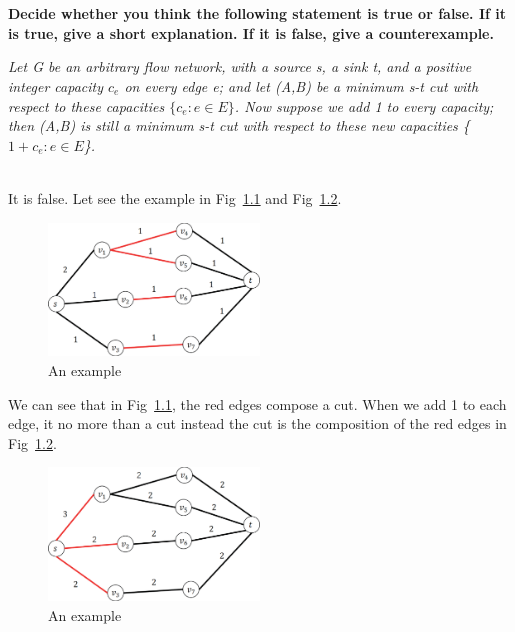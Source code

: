 
\chapter{}
\textbf{
Decide whether you think the following statement is true or false. If it is true, give a short explanation. If it is false, give a counterexample.
}

\emph{Let G be an arbitrary flow network, with a source s, a sink t, and a positive integer capacity $c_e$ on every edge e; and let (A,B) be a minimum s-t cut with respect to these capacities $\{c_e:e\in E\}$. Now suppose we add 1 to every capacity; then (A,B) is still a minimum s-t cut with respect to these new capacities \{$1+c_e:e\in E$\}.}

\hspace*{\fill} \\
It is false. Let see the example in Fig~\ref{pic_5_1} and
Fig~\ref{pic_5_2}.
\begin{figure}[!htbp]
\centering
\includegraphics[width=0.5\textwidth]{figures/2.eps}
\caption{An example}\label{pic_5_1}
\end{figure}
We can see that in Fig~\ref{pic_5_1}, the red edges compose a cut. When we add 1 to each edge, it no more than a cut instead the cut is the composition of the red edges in Fig~\ref{pic_5_2}.
\begin{figure}[!htbp]
\centering
\includegraphics[width=0.5\textwidth]{figures/3.eps}
\caption{An example}\label{pic_5_2}
\end{figure}